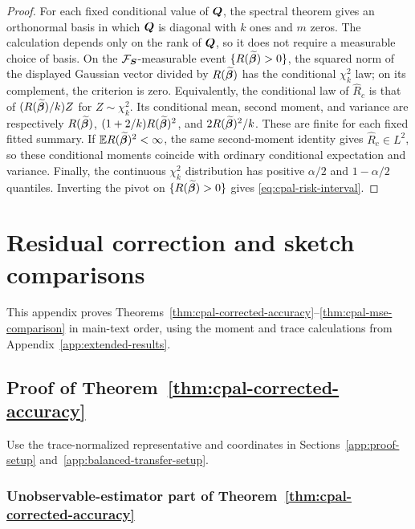 \documentclass{article}
\theoremstyle{plain} %
\theoremstyle{definition} %
\theoremstyle{definition} %
\begin{document}
\begin{proof}
For each fixed conditional value of $\boldsymbol{Q}$, the spectral theorem gives an
orthonormal basis in which $\boldsymbol{Q}$ is diagonal with $k$ ones and $m$ zeros.
The calculation depends only on the rank of $\boldsymbol{Q}$, so it does not require
a measurable choice of basis. On the ${\mathcal F}_{\boldsymbol{S}}$-measurable event
$\{R(\widetilde{\boldsymbol{\beta}})>0\}$, the squared norm of the displayed
Gaussian vector divided by $R(\widetilde{\boldsymbol{\beta}})$ has the conditional
$\chi^2_k$ law; on its complement, the criterion is zero. Equivalently,
the conditional law of $\widehat R_c$ is that of
$(R(\widetilde{\boldsymbol{\beta}})/k)Z$ for $Z\sim\chi^2_k$. Its conditional mean,
second moment, and variance are respectively
$R(\widetilde{\boldsymbol{\beta}})$,
$(1+2/k)R(\widetilde{\boldsymbol{\beta}})^2$, and
$2R(\widetilde{\boldsymbol{\beta}})^2/k$. These are finite for each fixed fitted
summary. If ${\mathbb{E}} R(\widetilde{\boldsymbol{\beta}})^2<\infty$, the same second-moment
identity gives $\widehat R_c\in L^2$, so these conditional
moments coincide with ordinary conditional expectation and variance.
Finally, the continuous $\chi^2_k$ distribution has positive
$\alpha/2$ and $1-\alpha/2$ quantiles. Inverting the pivot on
$\{R(\widetilde{\boldsymbol{\beta}})>0\}$ gives
\eqref{eq:cpal-risk-interval}.
\end{proof}

\clearpage
\section{Residual correction and sketch comparisons}
\label{app:setup-proofs}
\label{app:underparameterized-proofs}

This appendix proves
Theorems~\ref{thm:cpal-corrected-accuracy}--\ref{thm:cpal-mse-comparison}
in main-text order, using the moment and trace calculations from
Appendix~\ref{app:extended-results}.

\subsection{Proof of Theorem~\ref{thm:cpal-corrected-accuracy}}

Use the trace-normalized representative and coordinates in
Sections~\ref{app:proof-setup} and~\ref{app:balanced-transfer-setup}.

\subsubsection{Unobservable-estimator part of Theorem~\ref{thm:cpal-corrected-accuracy}}
\label{app:proof-R-sens-general}
\end{document}
